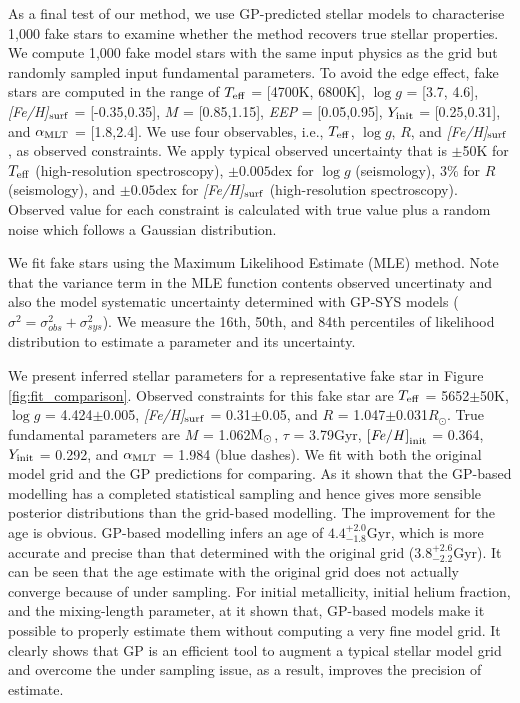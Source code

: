 As a final test of our method, we use GP-predicted stellar models to characterise 1,000 fake stars to examine whether the method recovers true stellar properties. 
We compute 1,000 fake model stars with the same input physics as the grid but randomly sampled input fundamental parameters. To avoid the edge effect, fake stars are computed in the range of $T_{\rm eff}$ = [4700K, 6800K], $\log g$ = [3.7, 4.6], {\it [Fe/H]}$_{\rm surf}$ = [-0.35,0.35], $M$ = [0.85,1.15], {\it EEP} = [0.05,0.95], $Y_{\rm init}$ = [0.25,0.31], and $\alpha_{\rm MLT}$ = [1.8,2.4].
%
We use four observables, i.e., $T_{\rm eff}$, $\log g$, $R$, and {\it [Fe/H]}$_{\rm surf}$, as observed constraints. We apply typical observed uncertainty that is $\pm$50K for $T_{\rm eff}$ (high-resolution spectroscopy), $\pm0.005$dex for $\log g$ (seismology), $3\%$ for $R$ (seismology), and $\pm0.05$dex for {\it [Fe/H]}$_{\rm surf}$ (high-resolution spectroscopy). Observed value for each constraint is calculated with true value plus a random noise which follows a Gaussian distribution.  

We fit fake stars using the Maximum Likelihood Estimate (MLE) method. Note that the variance term in the MLE function contents observed uncertinaty and also the model systematic uncertainty determined with GP-SYS models ($\sigma^{2} = \sigma_{obs}^{2} +  \sigma_{sys}^{2} $). We measure the 16th, 50th, and 84th percentiles of likelihood distribution to estimate a parameter and its uncertainty. 


We present inferred stellar parameters for a representative fake star in Figure \ref{fig:fit_comparison}. Observed constraints for this fake star are $T_{\rm eff}$ = 5652$\pm$50K, $\log g$ = 4.424$\pm$0.005, {\it [Fe/H]}$_{\rm surf}$ =  0.31$\pm$0.05, and $R$ =  1.047$\pm$0.031$R_{\odot}$. True fundamental parameters are $M$ = 1.062$\rm M_{\odot}$, $\tau$ = 3.79Gyr, $\rm {\it [Fe/H]}_{init}$ = 0.364, $Y_{\rm init}$ = 0.292, and $\alpha_{\rm MLT}$ = 1.984 (blue dashes). We fit with both the original model grid and the GP predictions for comparing.
%
As it shown that the GP-based modelling has a completed statistical sampling and hence gives more sensible posterior distributions than the grid-based modelling. The improvement for the age is obvious. GP-based modelling infers an age of $4.4^{+2.0}_{-1.8}$Gyr, which is more accurate and precise than that determined with the original grid ($3.8^{+2.6}_{-2.2}$Gyr). It can be seen that the age estimate with the original grid does not actually converge because of under sampling. For initial metallicity, initial helium fraction, and the mixing-length parameter, at it shown that, GP-based models make it possible to properly estimate them without computing a very fine model grid. It clearly shows that GP is an efficient tool to augment a typical stellar model grid and overcome the under sampling issue, as a result, improves the precision of estimate.  


